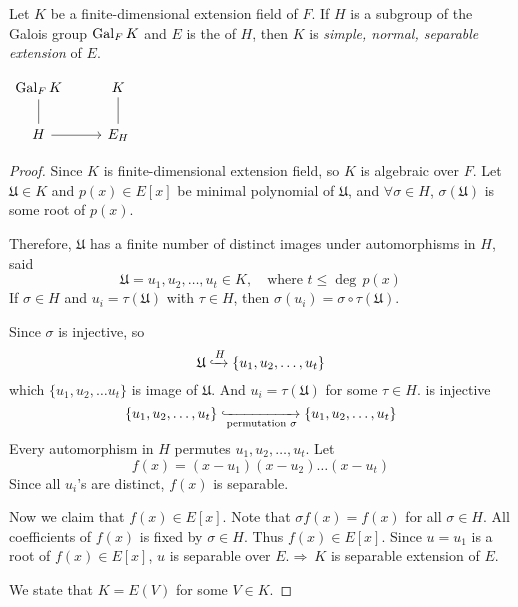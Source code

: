 \begin{lemma}
    Let $K$ be a finite-dimensional extension field of $F$. If $H$ is a subgroup of the Galois group 
    $\operatorname{Gal}_F K$ and $E$ is the  of $H$, then $K$ is 
    \textit{simple, normal, separable extension} of $E$.

    \begin{center}
        $\begin{tikzcd}
            \gal_F K  
            & K \arrow[dash]{d} \\
            H \arrow[dash]{u} \arrow[r]
            & E_H
            \end{tikzcd}
        $
    \end{center}
\end{lemma}
\begin{proof}
    Since $K$ is finite-dimensional extension field, so $K$ is algebraic over $F$. Let $\mathfrak{U} \in K$ and 
    $p(x) \in E[x]$ be minimal polynomial of $\mathfrak{U}$, and $\forall \sigma \in H$, $\sigma(\mathfrak{U})$ is 
    some root of $p(x)$.

    Therefore, $\mathfrak{U}$ has a finite number of distinct images under automorphisms in $H$, said 
    \[
        \mathfrak{U} = u_1, u_2, \ldots, u_t \in K, \quad \text{where } t \leq \deg\, p(x)
    \]
    If $\sigma \in H$ and $u_i = \tau(\mathfrak{U})$ with $\tau \in H$, then $\sigma(u_i) = \sigma \circ \tau (\mathfrak{U})$.

    Since $\sigma$ is injective, so 
    \[
        \mathfrak{U} \xhookrightarrow{H} \{ u_1, u_2, \ldots, u_t \}
    \]
    which $\{ u_1, u_2, \ldots u_t\}$ is image of $\mathfrak{U}$. And $u_i = \tau(\mathfrak{U})$ for some $\tau \in H$.
    is injective 
    \[
        \{ u_1, u_2, \ldots, u_t \} \xhookrightarrow[\text{permutation } \sigma]{} \{ u_1, u_2, \ldots, u_t \}
    \]
    Every automorphism in $H$ permutes $u_1, u_2, \ldots, u_t$. Let 
    \[
        f(x) = (x-u_1)(x-u_2)\ldots(x-u_t)
    \]
    Since all $u_i$'s are distinct, $f(x)$ is separable.

    Now we claim that $f(x) \in E[x]$. Note that $\sigma f(x) = f(x)$ for all $\sigma \in H$. All coefficients of 
    $f(x)$ is fixed by $\sigma \in H$. Thus $f(x) \in E[x]$. Since $u = u_1$ is a root of $f(x) \in E[x]$, $u$ is separable over 
    $E. \Longrightarrow \> K$ is separable extension of $E$.

    We state that $K = E(V)$ for some $V \in K$. 
\end{proof}

